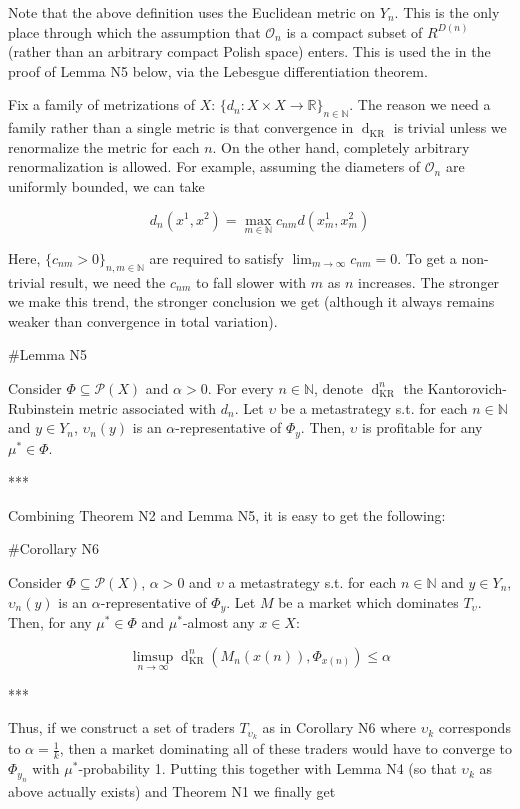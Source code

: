 \documentclass[a4paper]{article}
\newcommand{\Nats}{\mathbb{N}}
\newcommand{\Reals}{\mathbb{R}}
\newcommand{\Prob}{\mathcal{P}}
\newcommand{\Ob}{\mathcal{O}}
\newcommand{\Dkr}{\operatorname{d}_{\text{KR}}}
\begin{document}
Note that the above definition uses the Euclidean metric on ${Y_n}$. This is the only place through which the assumption that ${\Ob_n}$ is a compact subset of ${R^{D(n)}}$ (rather than an arbitrary compact Polish space) enters. This is used the in the proof of Lemma N5 below, via the Lebesgue differentiation theorem.

Fix a family of metrizations of ${X}$: ${\{d_n: X \times X \rightarrow \Reals\}_{n \in \Nats}}$. The reason we need a family rather than a single metric is that convergence in ${\Dkr}$ is trivial unless we renormalize the metric for each ${n}$. On the other hand, completely arbitrary renormalization is allowed. For example, assuming the diameters of $\Ob_n$ are uniformly bounded, we can take 

$$d_n(x^1,x^2)= \max_{m \in \Nats} c_{nm} d(x^1_m,x^2_m)$$

Here, ${\{c_{nm} > 0\}_{n,m \in \Nats}}$ are required to satisfy ${\lim_{m \rightarrow \infty} c_{nm} = 0}$. To get a non-trivial result, we need the ${c_{nm}}$ to fall slower with ${m}$ as ${n}$ increases. The stronger we make this trend, the stronger conclusion we get (although it always remains weaker than convergence in total variation).

\#Lemma N5

Consider ${\Phi \subseteq \Prob(X)}$ and ${\alpha > 0}$. For every ${n \in \Nats}$, denote ${\Dkr^n}$ the Kantorovich-Rubinstein metric associated with ${d_n}$. Let ${\upsilon}$ be a metastrategy s.t. for each ${n \in \Nats}$ and ${y \in Y_n}$, ${\upsilon_n(y)}$ is an $\alpha$-representative of ${\Phi_y}$. Then, ${\upsilon}$ is profitable for any ${\mu^* \in \Phi}$.

***

Combining Theorem N2 and Lemma N5, it is easy to get the following:

\#Corollary N6

Consider ${\Phi \subseteq \Prob(X)}$, ${\alpha > 0}$ and ${\upsilon}$ a metastrategy s.t. for each ${n \in \Nats}$ and ${y \in Y_n}$, ${\upsilon_n(y)}$ is an $\alpha$-representative of ${\Phi_y}$. Let ${M}$ be a market which dominates ${T_\upsilon}$. Then, for any ${\mu^* \in \Phi}$ and ${\mu^*}$-almost any ${x \in X}$:

$$\limsup_{n \rightarrow \infty} \Dkr^n(M_n(x(n)),\Phi_{x(n)}) \leq \alpha$$

***

Thus, if we construct a set of traders ${T_{\upsilon_k}}$ as in Corollary N6 where ${\upsilon_k}$ corresponds to ${\alpha=\frac{1}{k}}$, then a market dominating all of these traders would have to converge to ${\Phi_{y_n}}$ with ${\mu^*}$-probability 1. Putting this together with Lemma N4 (so that ${\upsilon_k}$ as above actually exists) and Theorem N1 we finally get
\end{document}
